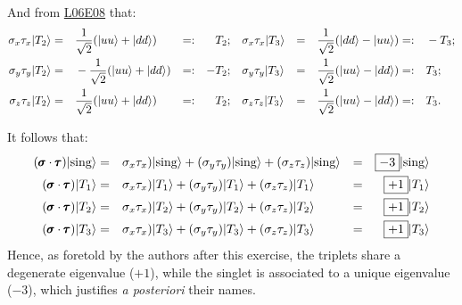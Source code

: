 \documentclass[solutions.tex]{subfiles}
\begin{document}
And from
\href{https://github.com/mbivert/ttm/blob/master/qm/L06E08.pdf}{L06E08} that:
\begin{equation*}\begin{aligned}
	\sigma_x\tau_x|T_2\rangle &=&& \frac1{\sqrt2}(|uu\rangle+|dd\rangle) &=:&& T_2; &&&
	\sigma_x\tau_x|T_3\rangle &=&& \frac1{\sqrt2}(|dd\rangle-|uu\rangle) &=:&& -T_3; \\
	\sigma_y\tau_y|T_2\rangle &=&& -\frac1{\sqrt2}(|uu\rangle+|dd\rangle) &=:&& -T_2; &&&
	\sigma_y\tau_y|T_3\rangle &=&& \frac1{\sqrt2}(|uu\rangle-|dd\rangle) &=:&& T_3; \\
	\sigma_z\tau_z|T_2\rangle &=&& \frac1{\sqrt2}(|uu\rangle+|dd\rangle) &=:&& T_2; &&&
	\sigma_z\tau_z|T_3\rangle &=&& \frac1{\sqrt2}(|uu\rangle-|dd\rangle) &=:&& T_3. \\
\end{aligned}\end{equation*}

It follows that:
\begin{equation*}\begin{aligned}
	(\pmb{\sigma}\cdot\pmb{\tau})|\text{sing}\rangle &=&&
		\sigma_x\tau_x)|\text{sing}\rangle
		+ (\sigma_y\tau_y)|\text{sing}\rangle
		+ (\sigma_z\tau_z)|\text{sing}\rangle &=&& \boxed{-3}|\text{sing}\rangle \\
	(\pmb{\sigma}\cdot\pmb{\tau})|T_1\rangle &=&&
		\sigma_x\tau_x)|T_1\rangle
		+ (\sigma_y\tau_y)|T_1\rangle
		+ (\sigma_z\tau_z)|T_1\rangle &=&& \boxed{+1}|T_1\rangle \\
	(\pmb{\sigma}\cdot\pmb{\tau})|T_2\rangle &=&&
		\sigma_x\tau_x)|T_2\rangle
		+ (\sigma_y\tau_y)|T_2\rangle
		+ (\sigma_z\tau_z)|T_2\rangle &=&& \boxed{+1}|T_2\rangle \\
	(\pmb{\sigma}\cdot\pmb{\tau})|T_3\rangle &=&&
		\sigma_x\tau_x)|T_3\rangle
		+ (\sigma_y\tau_y)|T_3\rangle
		+ (\sigma_z\tau_z)|T_3\rangle &=&& \boxed{+1}|T_3\rangle
\end{aligned}\end{equation*}
Hence, as foretold by the authors after this exercise, the triplets
share a degenerate eigenvalue ($+1$), while the singlet is associated to
a unique eigenvalue ($-3$), which justifies \textit{a posteriori} their
names.
\end{document}
